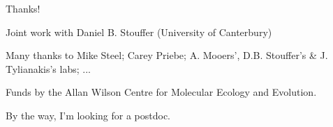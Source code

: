 \documentclass[ignorenonframetext,]{beamer}
\begin{document}
\begin{frame}{Thanks!}

\begin{centering}

Joint work with  
Daniel B. Stouffer (University of Canterbury)

Many thanks to  
Mike Steel; Carey Priebe; A. Mooers', D.B. Stouffer's \& J. Tylianakis's labs; ...

Funds by the Allan Wilson Centre for Molecular Ecology and Evolution.

\vspace{2cm}

\small{By the way, I'm looking for a postdoc.}

\end{centering}

\end{frame}
\end{document}
